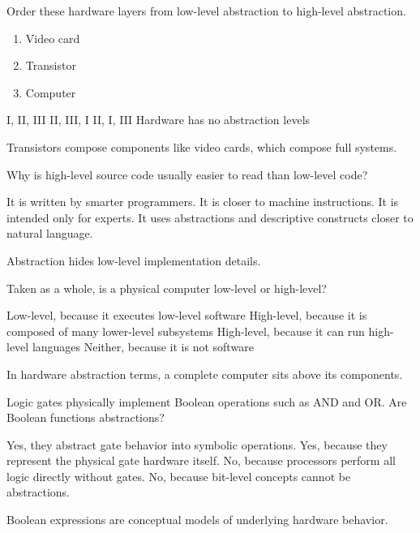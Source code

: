 \question[5]
Order these hardware layers from low-level abstraction to high-level abstraction.
\begin{enumerate}
  \renewcommand{\labelenumi}{\Roman{enumi}.}
  \item Video card
  \item Transistor
  \item Computer
\end{enumerate}
\begin{choices}
  \choice I, II, III
  \choice II, III, I
  \CorrectChoice II, I, III
  \choice Hardware has no abstraction levels
\end{choices}
\begin{solution}
  Transistors compose components like video cards, which compose full systems.
\end{solution}

\newpage 

\question[5]
Why is high-level source code usually easier to read than low-level code?
\begin{choices}
  \choice It is written by smarter programmers.
  \choice It is closer to machine instructions.
  \choice It is intended only for experts.
  \CorrectChoice It uses abstractions and descriptive constructs closer to natural language.
\end{choices}
\begin{solution}
  Abstraction hides low-level implementation details.
\end{solution}


\question[5]
Taken as a whole, is a physical computer low-level or high-level?
\begin{choices}
  \choice Low-level, because it executes low-level software
  \CorrectChoice High-level, because it is composed of many lower-level subsystems
  \choice High-level, because it can run high-level languages
  \choice Neither, because it is not software
\end{choices}
\begin{solution}
  In hardware abstraction terms, a complete computer sits above its components.
\end{solution}

\question[5]
Logic gates physically implement Boolean operations such as AND and OR. Are Boolean functions abstractions?
\begin{choices}
  \CorrectChoice Yes, they abstract gate behavior into symbolic operations.
  \choice Yes, because they represent the physical gate hardware itself.
  \choice No, because processors perform all logic directly without gates.
  \choice No, because bit-level concepts cannot be abstractions.
\end{choices}
\begin{solution}
  Boolean expressions are conceptual models of underlying hardware behavior.
\end{solution}

